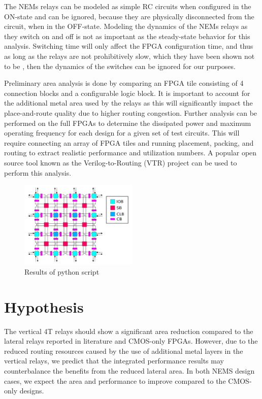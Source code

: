 \documentclass[twoside,twocolumn]{article}
\begin{document}
The NEMs relays can be modeled as simple RC circuits when configured in the 
ON-state \cite{chen_efficient_2010} \cite{chen_integrated_2008} and can be ignored, 
because they are physically disconnected from the 
circuit, when in the OFF-state. Modeling the dynamics of the NEMs relays
as they switch on and off is not as important as the steady-state behavior
for this analysis. Switching time will only affect the FPGA configuration
time, and thus as long as the relays are not prohibitively slow, which they
have been shown not to be \cite{chen_integrated_2008}, then the dynamics of the switches can be 
ignored for our purposes.

Preliminary area analysis is done by comparing an FPGA tile consisting of 4 connection blocks and a configurable logic block.
It is important to account for the additional metal area used by the 
relays as this will significantly impact the place-and-route quality
due to higher routing congestion. Further analysis can be performed 
on the full FPGAs to determine the dissipated power and maximum 
operating frequency for each design for a given set of test circuits.
This will require connecting an array of FPGA tiles and running 
placement, packing, and routing to extract realistic performance and
utilization numbers. A popular open source tool known as the Verilog-to-Routing 
(VTR) project \cite{vtr8} can be used to perform this analysis.  

\begin{figure}[!hbt]
    \centering
    \caption{Results of python script}
    \label{fig:results}
    \includegraphics[width=0.5\textwidth]{figs/island_style.png}
\end{figure}


\section{Hypothesis}
The vertical 4T relays should show a significant area reduction compared to the
lateral relays reported in literature and CMOS-only FPGAs. However, due to the reduced routing resources caused
by the use of additional metal layers in the vertical relays, we predict that the integrated
performance results may counterbalance the benefits from the reduced lateral area. In both NEMS design 
cases, we expect the area and performance to improve compared to the CMOS-only designs.
\end{document}
